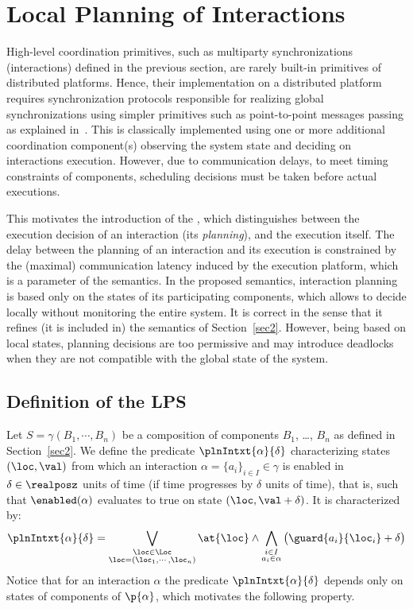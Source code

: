 \label{chap:5}
\minitoc
\section{Local Planning of Interactions}
\label{sec3}
High-level coordination primitives, such as multiparty synchronizations (interactions) defined in the previous section, are rarely built-in primitives of distributed platforms.
Hence, their implementation on a distributed platform requires synchronization protocols responsible for realizing global synchronizations
using simpler primitives such as point-to-point messages passing as explained in~\cite{bip-par}. 
This is classically implemented using one or more additional coordination component(s) observing the system state and deciding on interactions execution.
However, due to communication delays, to meet timing constraints of components, scheduling decisions must be taken before actual executions.

This motivates the introduction of the \emph{\lpsb}, which distinguishes between the execution decision of an interaction (its \emph{planning}), and the execution itself.
The delay between the planning of an interaction and its execution is constrained by the (maximal) communication latency induced by the execution platform, which is a parameter of the semantics.
In the proposed semantics, interaction planning is based only on the states of its participating components, which allows to decide locally without monitoring the entire system.
It is correct in the sense that it refines (it is included in) the semantics of Section~\ref{sec2}.
However, being based on local states, planning decisions are too permissive and may introduce deadlocks when they are not compatible with the global state of the system.

\subsection{Definition of the LPS}
\label{subsec:wp} 
Let $S=\gamma(B_1,\cdots,B_n)$ be a composition of components $B_1$, \ldots, $B_n$ as defined in Section~\ref{sec2}.
We define the predicate $\plnIntxt{\alpha}{\delta}$ characterizing states $(\loc, \val)$
from which an interaction $\alpha = \{ a_i \}_{i \in I} \in \gamma$ is enabled in $\delta \in \realposz$ units of time (if time progresses by $\delta$ units of time),
that is, such that $\enabled(\alpha)$ evaluates to true on state $(\loc, \val + \delta)$.
It is characterized by:
  \begin{equation}\label{eq:enf1}
    \plnIntxt{\alpha}{\delta} = \bigvee_{\substack{\loc\in\Loc\\\loc=(\loc_1,\cdots,\loc_n)}}\at{\loc} \wedge \bigwedge_{\substack{i\in I\\a_i\in\alpha}}  \big(\guard{a_i}{\loc_i} + \delta\big)
  \end{equation}
Notice that for an interaction $\alpha$ the predicate $\plnIntxt{\alpha}{\delta}$ depends only on states of components of $\p{\alpha}$, which motivates the following property.


